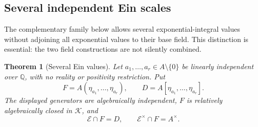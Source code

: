 \documentclass[11pt,a4paper]{article}
\numberwithin{equation}{section}
\newtheorem{theorem}{Theorem}[section]
\theoremstyle{definition}
\theoremstyle{remark}
\begin{document}
\subsection{Several independent Ein scales}

The complementary family below allows several exponential-integral
values without adjoining all exponential values to their base field.
This distinction is essential: the two field constructions are not
silently combined.

\begin{theorem}[Several Ein values]
\label{ev:several-Ein}
Let $a_1,\ldots,a_r\in A\setminus\{0\}$ be linearly independent over
$\mathbb Q$, with no reality or positivity restriction.  Put
\[
 F=A(\eta_{a_1},\ldots,\eta_{a_r}),\qquad
 D=A[\eta_{a_1},\ldots,\eta_{a_r}].
\]
The displayed generators are algebraically independent, $F$ is
relatively algebraically closed in $\mathcal K$, and
\[
 \mathcal E\cap F=D,
 \qquad
 \mathcal E^\times\cap F=A^\times.
\]
\end{theorem}
\end{document}
